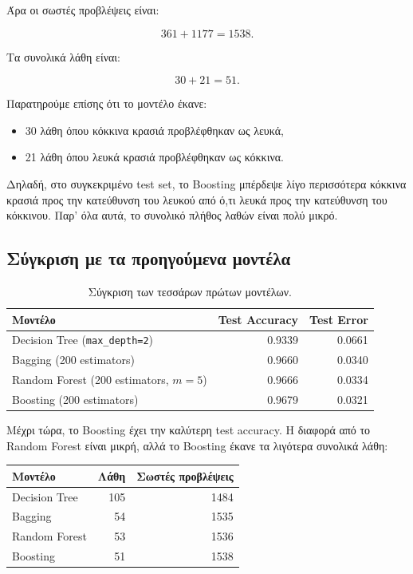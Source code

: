 \documentclass[12pt,a4paper]{article}
\newcommand{\code}[1]{\texttt{\textenglish{#1}}}
\begin{document}
Άρα οι σωστές προβλέψεις είναι:

\[
    361 + 1177 = 1538.
\]

Τα συνολικά λάθη είναι:

\[
    30 + 21 = 51.
\]

Παρατηρούμε επίσης ότι το μοντέλο έκανε:

\begin{itemize}
    \item 30 λάθη όπου κόκκινα κρασιά προβλέφθηκαν ως λευκά,
    \item 21 λάθη όπου λευκά κρασιά προβλέφθηκαν ως κόκκινα.
\end{itemize}

Δηλαδή, στο συγκεκριμένο test set, το Boosting μπέρδεψε λίγο περισσότερα
κόκκινα κρασιά προς την κατεύθυνση του λευκού από ό,τι λευκά προς την
κατεύθυνση του κόκκινου. Παρ' όλα αυτά, το συνολικό πλήθος λαθών είναι πολύ
μικρό.

\subsection{Σύγκριση με τα προηγούμενα μοντέλα}

\begin{table}[H]
\centering
\caption{Σύγκριση των τεσσάρων πρώτων μοντέλων.}
\begin{tabular}{lrr}
\toprule
\textbf{Μοντέλο} & \textbf{Test Accuracy} & \textbf{Test Error} \\
\midrule
Decision Tree (\code{max\_depth=2}) & 0.9339 & 0.0661 \\
Bagging (200 estimators) & 0.9660 & 0.0340 \\
Random Forest (200 estimators, $m=5$) & 0.9666 & 0.0334 \\
Boosting (200 estimators) & 0.9679 & 0.0321 \\
\bottomrule
\end{tabular}
\end{table}

Μέχρι τώρα, το Boosting έχει την καλύτερη test accuracy. Η διαφορά από το
Random Forest είναι μικρή, αλλά το Boosting έκανε τα λιγότερα συνολικά λάθη:

\begin{center}
\begin{tabular}{lrr}
\toprule
\textbf{Μοντέλο} & \textbf{Λάθη} & \textbf{Σωστές προβλέψεις} \\
\midrule
Decision Tree & 105 & 1484 \\
Bagging & 54 & 1535 \\
Random Forest & 53 & 1536 \\
Boosting & 51 & 1538 \\
\bottomrule
\end{tabular}
\end{center}
\end{document}
